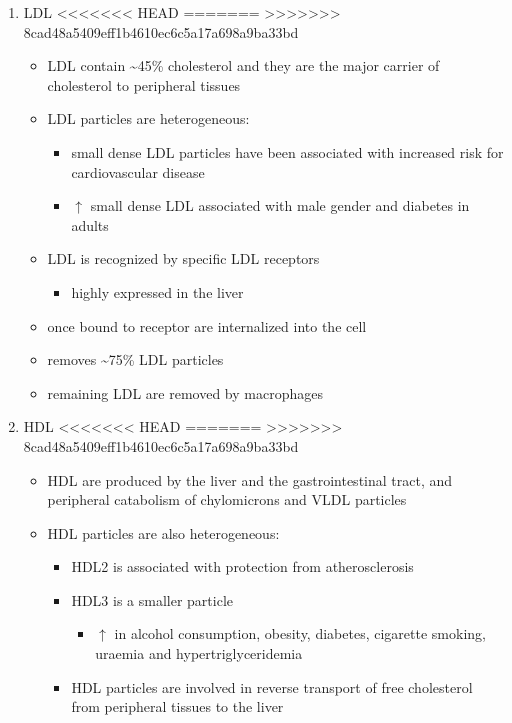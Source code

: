 \documentclass{scrartcl}
\begin{document}
\begin{enumerate}
\item LDL
<<<<<<< HEAD
\label{sec:org52d93a2}
=======
\label{sec:orgfae0080}
>>>>>>> 8cad48a5409eff1b4610ec6c5a17a698a9ba33bd
\begin{itemize}
\item LDL contain \textasciitilde{}45\% cholesterol and they are the major carrier of
cholesterol to peripheral tissues
\item LDL particles are heterogeneous:
\begin{itemize}
\item small dense LDL particles have been associated with increased risk
for cardiovascular disease
\item \(\uparrow\) small dense LDL associated with male gender and diabetes in adults
\end{itemize}
\item LDL is recognized by specific LDL receptors
\begin{itemize}
\item highly expressed in the liver
\end{itemize}
\item once bound to receptor are internalized into the cell
\item removes \textasciitilde{}75\% LDL particles
\item remaining LDL are removed by macrophages
\end{itemize}
\item HDL
<<<<<<< HEAD
\label{sec:org8a33d09}
=======
\label{sec:orgb173b96}
>>>>>>> 8cad48a5409eff1b4610ec6c5a17a698a9ba33bd
\begin{itemize}
\item HDL are produced by the liver and the gastrointestinal tract, and
peripheral catabolism of chylomicrons and VLDL particles
\item HDL particles are also heterogeneous:
\begin{itemize}
\item HDL2 is associated with protection from atherosclerosis
\item HDL3 is a smaller particle
\begin{itemize}
\item \(\uparrow\) in alcohol consumption, obesity, diabetes, cigarette
smoking, uraemia and hypertriglyceridemia
\end{itemize}
\item HDL particles are involved in reverse transport of free
cholesterol from peripheral tissues to the liver

\end{itemize}
\end{itemize}
\end{enumerate}
\end{document}
